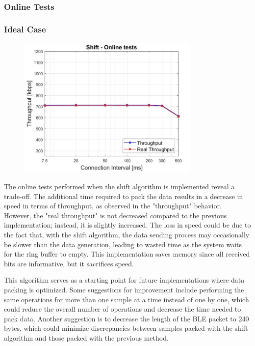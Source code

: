 \documentclass{Configuration_Files/PoliMi3i_thesis}
\begin{document}
\subsubsection*{Online Tests}
\subsubsection*{Ideal Case}

\begin{figure}[h!]
    \centering
    \includegraphics[width=0.8\textwidth]{Results Manuel/figure15}
    \label{fig:figure1}
\end{figure}

The online tests performed when the shift algorithm is implemented reveal a trade-off. The additional time required to pack the data results in a decrease in speed in terms of throughput, as observed in the "throughput" behavior. However, the "real throughput" is not decreased compared to the previous implementation; instead, it is slightly increased. The loss in speed could be due to the fact that, with the shift algorithm, the data sending process may occasionally be slower than the data generation, leading to wasted time as the system waits for the ring buffer to empty. This implementation saves memory since all received bits are informative, but it sacrifices speed.

This algorithm serves as a starting point for future implementations where data packing is optimized. Some suggestions for improvement include performing the same operations for more than one sample at a time instead of one by one, which could reduce the overall number of operations and decrease the time needed to pack data. Another suggestion is to decrease the length of the BLE packet to 240 bytes, which could minimize discrepancies between samples packed with the shift algorithm and those packed with the previous method.
\end{document}
